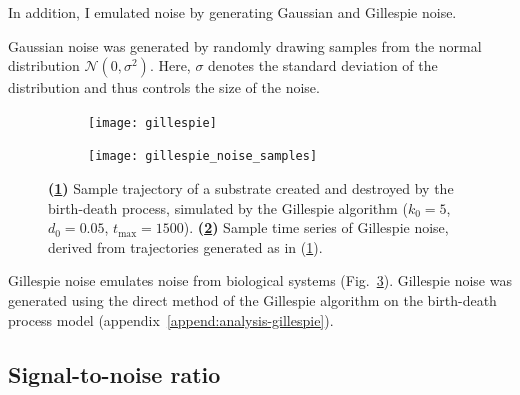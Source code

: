 In addition, I emulated noise by generating Gaussian and Gillespie noise.

Gaussian noise was generated by randomly drawing samples from the normal distribution $\mathcal{N}(0,\sigma^{2})$.
Here, $\sigma$ denotes the standard deviation of the distribution and thus controls the size of the noise.

\begin{figure}
  \centering
  \begin{subfigure}{0.4\textwidth}
    \centering
    \texttt{[image: gillespie]}
    \caption{
    }
    \label{fig:gillespie_trajectory}
  \end{subfigure}%
 \begin{subfigure}{0.6\textwidth}
    \centering
    \texttt{[image: gillespie\_noise\_samples]}
    \caption{
    }
    \label{fig:gillespie_noise_samples}
  \end{subfigure}

  \caption{
    \textbf{(\ref{fig:gillespie_trajectory})}
    Sample trajectory of a substrate created and destroyed by the birth-death process, simulated by the Gillespie algorithm ($k_{0} = 5$, $d_{0} = 0.05$, $t_{\mathrm{max}} = 1500$).
    \textbf{(\ref{fig:gillespie_noise_samples})}
    Sample time series of Gillespie noise, derived from trajectories generated as in (\ref{fig:gillespie_trajectory}).
  }
  \label{fig:gillespie_noise}
\end{figure}

Gillespie noise emulates noise from biological systems (Fig.\ \ref{fig:gillespie_noise}).
Gillespie noise was generated using the direct method of the Gillespie algorithm \parencite{gillespieExactStochasticSimulation1977} on the birth-death process model (appendix~\ref{append:analysis-gillespie}).

\subsection{Signal-to-noise ratio}
\label{subsec:methods-computational-snr}

